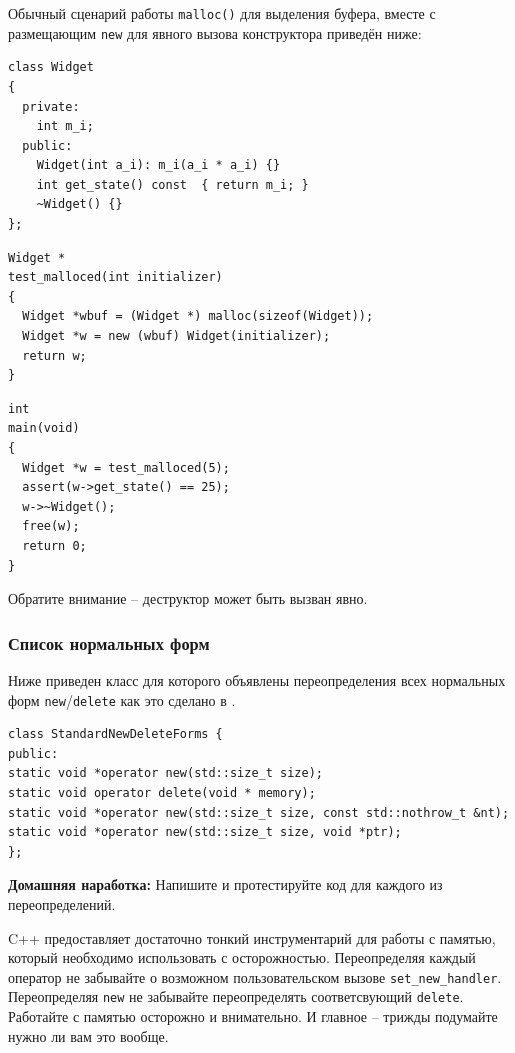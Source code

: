 \documentclass[a4paper,12pt,oneside]{article}
\begin{document}
Обычный сценарий работы \lstinline!malloc()! для выделения буфера, вместе с размещающим \lstinline!new! для явного вызова конструктора приведён ниже:

\begin{lstlisting}
class Widget
{
  private:
    int m_i;
  public:
    Widget(int a_i): m_i(a_i * a_i) {}
    int get_state() const  { return m_i; }
    ~Widget() {}
};
\end{lstlisting}

\begin{lstlisting}
Widget *
test_malloced(int initializer)
{
  Widget *wbuf = (Widget *) malloc(sizeof(Widget));
  Widget *w = new (wbuf) Widget(initializer);
  return w;
}
\end{lstlisting}

\begin{lstlisting}
int 
main(void)
{
  Widget *w = test_malloced(5);
  assert(w->get_state() == 25);
  w->~Widget();
  free(w);
  return 0;
}
\end{lstlisting}

Обратите внимание -- деструктор может быть вызван явно.

\subsubsection{Список нормальных форм}\label{NewOverloading}

Ниже приведен класс для которого объявлены переопределения всех нормальных форм \lstinline!new!/\lstinline!delete! как это сделано в \cite{effcpp3d}.

\begin{lstlisting}
class StandardNewDeleteForms {
public:
static void *operator new(std::size_t size);
static void operator delete(void * memory);
static void *operator new(std::size_t size, const std::nothrow_t &nt);
static void *operator new(std::size_t size, void *ptr);
};
\end{lstlisting}

\textbf{Домашняя наработка:} Напишите и протестируйте код для каждого из переопределений.

C++ предоставляет достаточно тонкий инструментарий для работы с памятью, который необходимо использовать с осторожностью. Переопределяя каждый оператор не забывайте о возможном пользовательском вызове \lstinline!set_new_handler!. Переопределяя \lstinline!new! не забывайте переопределять соответсвующий \lstinline!delete!. Работайте с памятью осторожно и внимательно. И главное -- трижды подумайте нужно ли вам это вообще.
\end{document}

